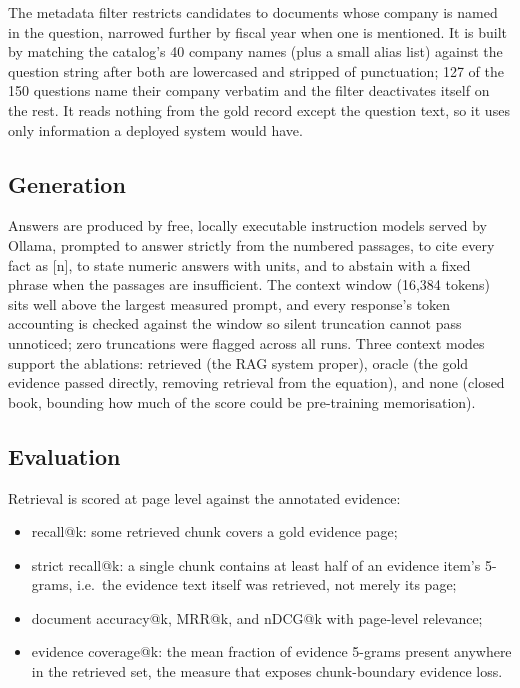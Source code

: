 \documentclass[
  11pt,
]{article}
\newcounter{none} %
\providecommand{\tightlist}{%
  \setlength{\itemsep}{0pt}\setlength{\parskip}{0pt}}
\begin{document}
The metadata filter restricts candidates to documents whose company is
named in the question, narrowed further by fiscal year when one is
mentioned. It is built by matching the catalog's 40 company names (plus
a small alias list) against the question string after both are
lowercased and stripped of punctuation; 127 of the 150 questions name
their company verbatim and the filter deactivates itself on the rest. It
reads nothing from the gold record except the question text, so it uses
only information a deployed system would have.

\subsection{Generation}\label{generation}

Answers are produced by free, locally executable instruction models
served by Ollama, prompted to answer strictly from the numbered
passages, to cite every fact as {[}n{]}, to state numeric answers with
units, and to abstain with a fixed phrase when the passages are
insufficient. The context window (16,384 tokens) sits well above the
largest measured prompt, and every response's token accounting is
checked against the window so silent truncation cannot pass unnoticed;
zero truncations were flagged across all runs. Three context modes
support the ablations: retrieved (the RAG system proper), oracle (the
gold evidence passed directly, removing retrieval from the equation),
and none (closed book, bounding how much of the score could be
pre-training memorisation).

\subsection{Evaluation}\label{evaluation}

Retrieval is scored at page level against the annotated evidence:

\begin{itemize}
\tightlist
\item
  recall@k: some retrieved chunk covers a gold evidence page;
\item
  strict recall@k: a single chunk contains at least half of an evidence
  item's 5-grams, i.e.~the evidence text itself was retrieved, not
  merely its page;
\item
  document accuracy@k, MRR@k, and nDCG@k with page-level relevance;
\item
  evidence coverage@k: the mean fraction of evidence 5-grams present
  anywhere in the retrieved set, the measure that exposes chunk-boundary
  evidence loss.
\end{itemize}
\end{document}
